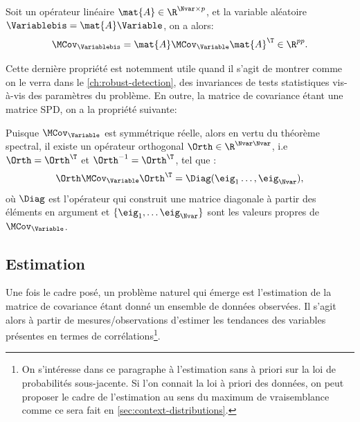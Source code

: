 \begin{property}
  \label{prop:context-definition-lineartraonsformation}
  Soit un opérateur linéaire $\mat{A}\in\R^{\Nvar\times p}$, et la variable aléatoire $\Variablebis=\mat{A}\Variable$, on a alors:
  \begin{equation}
    \MCov_\Variablebis = \mat{A}\MCov_\Variable\mat{A}^\T \in \R^{pp}.
    \label{eq:context-definition-lineartraonsformation}
  \end{equation}

\end{property}

Cette dernière propriété est notemment utile quand il s'agit de montrer comme on le verra dans le \cref{ch:robust-detection}, des invariances de tests statistiques vis-à-vis des paramètres du problème. En outre, la matrice de covariance étant une matrice SPD, on a la propriété suivante:

\begin{property}[{Diagonalisation}]
  \label{prop:context-definition-diagonalisation}
  Puisque $\MCov_\Variable$ est symmétrique réelle, alors en vertu du théorème spectral, il existe un opérateur orthogonal $\Orth\in\R^{\Nvar\Nvar}$, i.e $\Orth=\Orth^\T$ et $\Orth^{-1}=\Orth^\T$, tel que :
  \begin{equation}
    \Orth\MCov_\Variable\Orth^\T = \Diag(\eig_1\dots,\eig_\Nvar),
    \label{eq:context-definition-diagonalisation}
  \end{equation}
  où $\Diag$ est l'opérateur qui construit une matrice diagonale à partir des éléments en argument et $\{\eig_1,\dots\eig_\Nvar\}$ sont les valeurs propres de $\MCov_\Variable$.

\end{property}

\subsection{Estimation}
\label{subsec:context-covariance-estimation}

Une fois le cadre posé, un problème naturel qui émerge est l'estimation de la matrice de covariance étant donné un ensemble de données observées. Il s'agit alors à partir de mesures/observations d'estimer les tendances des variables présentes en termes de corrélations\footnote{On s'intéresse dans ce paragraphe à l'estimation sans à priori sur la loi de probabilités sous-jacente. Si l'on connait la loi à priori des données, on peut proposer le cadre de l'estimation au sens du maximum de vraisemblance comme ce sera fait en \cref{sec:context-distributions}.}.

